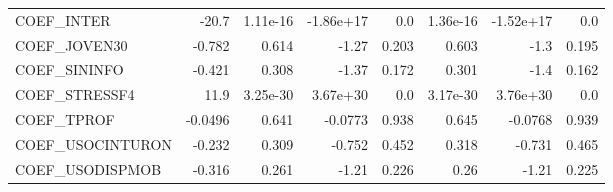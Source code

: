 \begin{tabular}{lrrrrrrr}
COEF\_INTER       &     -20.7 & 1.11e-16 & -1.86e+17 &      0.0 &      1.36e-16 &    -1.52e+17 &           0.0 \\
COEF\_JOVEN30     &    -0.782 &    0.614 &     -1.27 &    0.203 &         0.603 &         -1.3 &         0.195 \\
COEF\_SININFO     &    -0.421 &    0.308 &     -1.37 &    0.172 &         0.301 &         -1.4 &         0.162 \\
COEF\_STRESSF4    &      11.9 & 3.25e-30 &  3.67e+30 &      0.0 &      3.17e-30 &     3.76e+30 &           0.0 \\
COEF\_TPROF       &   -0.0496 &    0.641 &   -0.0773 &    0.938 &         0.645 &      -0.0768 &         0.939 \\
COEF\_USOCINTURON &    -0.232 &    0.309 &    -0.752 &    0.452 &         0.318 &       -0.731 &         0.465 \\
COEF\_USODISPMOB  &    -0.316 &    0.261 &     -1.21 &    0.226 &          0.26 &        -1.21 &         0.225 \\
\bottomrule
\end{tabular}

